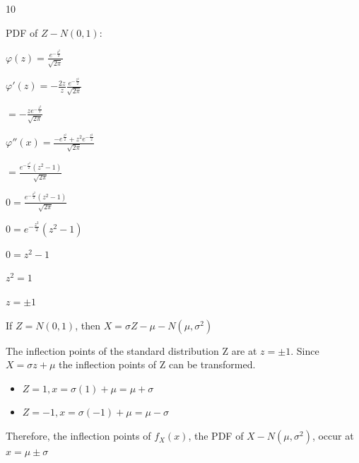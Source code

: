 \documentclass[12 pt]{article}
\begin{document}
    \begin{exercise}{10}
    \hfill

    PDF of $Z - N(0,1)$:

    $\varphi(z) = \frac{e^{-\frac{z^2}{2}}}{\sqrt{2 \pi}}$

    $\varphi'(z) = - \frac{2z}{z} \frac{e^{-\frac{z^2}{2}}}{\sqrt{2 \pi}}$

    $= - \frac{ze^{-\frac{z^2}{2}}}{\sqrt{2 \pi}}$

    $\varphi''(x) = \frac{-e^{\frac{z^2}{2}} + z^2 e^{-\frac{z^2}{2}}}{\sqrt{2 \pi}}$

    $= \frac{e^{-\frac{z^2}{2}}(z^2 -1)}{\sqrt{2 \pi}}$

    $0 = \frac{e^{-\frac{z^2}{2}}(z^2 -1)}{\sqrt{2 \pi}}$

    $0 = e^{-\frac{z^2}{2}}(z^2 -1)$

    $0 = z^2 -1$

    $z^2 = 1$

    $z = \pm 1$

    If $Z = N(0,1)$, then $X= \sigma Z - \mu - N(\mu, {\sigma}^2)$

    \hfill

    The inflection points of the standard distribution Z are at $z = \pm 1$. Since $X = \sigma z + \mu$ the inflection points of Z can be transformed.
    \begin{itemize}
        \item $Z= 1, x = \sigma(1) + \mu = \mu + \sigma$
        \item $Z = -1, x = \sigma(-1) + \mu = \mu - \sigma$
    \end{itemize}

    Therefore, the inflection points of $f_X(x)$, the PDF of $X - N(\mu, {\sigma}^2)$, occur at $x = \mu \pm \sigma$

    \hfill
    \end{exercise}
\end{document}
